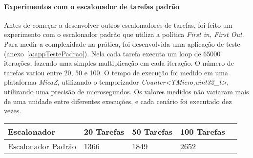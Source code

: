 \paragraph{Experimentos com o escalonador de tarefas padrão}
Antes de começar a desenvolver outros escalonadores de tarefas, foi feito um experimento com o escalonador 
padrão que utiliza a política \textit{First in, First Out}.
Para medir a complexidade na prática, foi desenvolvida uma aplicação de teste (anexo~\ref{a:appTestePadrao}). Nela cada tarefa executa um loop de 65000
iterações, fazendo uma simples multiplicação em cada iteração. O número de tarefas variou entre 20, 50 e 100.
O tempo de execução foi medido em uma plataforma \textit{MicaZ}, utilizando o temporizador
\textit{Counter<TMicro,uint32\_t>}, utilizando uma precisão de microsegundos.
Os valores medidos não variaram mais de uma unidade entre diferentes execuções, e cada cenário foi executado dez
vezes.
\begin{center}
    \begin{tabular}{ | l | l | l | l | p{5cm} |}
    \hline
    Escalonador              & 20 Tarefas & 50 Tarefas & 100 Tarefas \\ \hline
    Escalonador Padrão       & 1366 & 1849 & 2652 \\ \hline
    \end{tabular}
\end{center}

